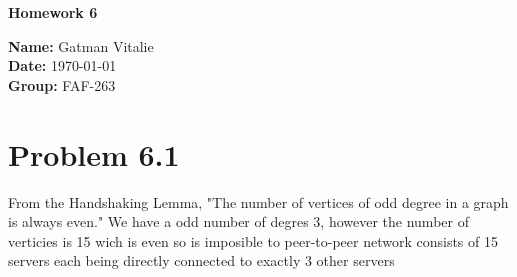 \documentclass[12pt]{article}
\begin{document}
\begin{titlepage}
	\thispagestyle{fancy} %
	\centering

	\vspace*{4cm}

	{\Huge \bfseries Homework 6}

	\vspace{4cm}

	{\Large \textbf{Name:} Gatman Vitalie} \\[0.5em]
	{\Large \textbf{Date:} \today} \\[0.5em]
	{\Large \textbf{Group:} FAF-263}

	\vfill
\end{titlepage}

\newpage

\section*{Problem 6.1}
From the Handshaking Lemma, "The number of vertices of odd degree in a graph is always even."
We have a odd number of degres 3, however the number of verticies is 15 wich is even so is imposible to peer-to-peer network consists of 15 servers each being directly connected to exactly
3 other servers
\end{document}
